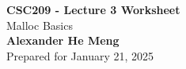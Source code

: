 \begin{titlepage}
    \null %
    \vfill
    \begin{center}
        {\fontsize{40}{48}\selectfont \bfseries CSC209 - Lecture 3 Worksheet}
        \vspace{20pt} \\
        {\LARGE Malloc Basics} \\
        \vspace{20pt}
        \textbf{Alexander He Meng}
        \vspace{8pt}
        \\ Prepared for January 21, 2025
    \end{center}
    \vfill
\end{titlepage}
